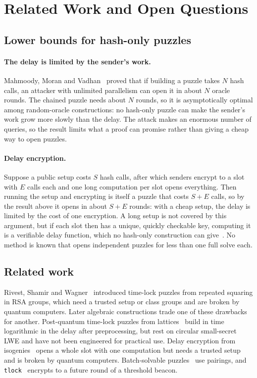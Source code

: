 \section{Related Work and Open Questions}\label{sec:related}

\subsection{Lower bounds for hash-only puzzles}\label{sec:limits}\label{sec:mmv-limit}\label{sec:delay-encryption}\label{sec:batching}

\paragraph{The delay is limited by the sender's work.}
Mahmoody, Moran and Vadhan~\cite{MMV11} proved that if building a puzzle takes $N$ hash calls, an attacker with unlimited parallelism can open it in about $N$ oracle rounds. The chained puzzle needs about $N$ rounds, so it is asymptotically optimal among random-oracle constructions: no hash-only puzzle can make the sender's work grow more slowly than the delay. The attack makes an enormous number of queries, so the result limits what a proof can promise rather than giving a cheap way to open puzzles.

\paragraph{Delay encryption.}
Suppose a public setup costs $S$ hash calls, after which senders encrypt to a slot with $E$ calls each and one long computation per slot opens everything. Then running the setup and encrypting is itself a puzzle that costs $S + E$ calls, so by the result above it opens in about $S + E$ rounds: with a cheap setup, the delay is limited by the cost of one encryption. A long setup is not covered by this argument, but if each slot then has a unique, quickly checkable key, computing it is a verifiable delay function, which no hash-only construction can give~\cite{MSW20,GRY25,AAKTvC26}. No method is known that opens independent puzzles for less than one full solve each.

\subsection{Related work}\label{sec:prior}

Rivest, Shamir and Wagner~\cite{RSW96} introduced time-lock puzzles from repeated squaring in RSA groups, which need a trusted setup or class groups and are broken by quantum computers. Later algebraic constructions trade one of these drawbacks for another. Post-quantum time-lock puzzles from lattices~\cite{AMZ24} build in time logarithmic in the delay after preprocessing, but rest on circular small-secret LWE and have not been engineered for practical use. Delay encryption from isogenies~\cite{BDF21} opens a whole slot with one computation but needs a trusted setup and is broken by quantum computers. Batch-solvable puzzles~\cite{DGM24} use pairings, and \texttt{tlock}~\cite{GMR23} encrypts to a future round of a threshold beacon.

